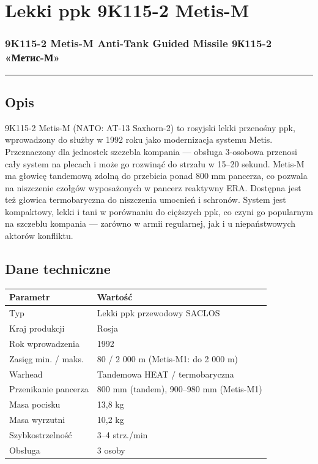 \documentclass[12pt,openany,oneside]{book}
\begin{document}
\chapter{Lekki ppk 9K115-2 Metis-M}\label{lekki-ppk-9k115-2-metis-m}

\subsection{9K115-2 Metis-M Anti-Tank Guided Missile \textbar{} 9К115-2
«Метис-М»}\label{k115-2-metis-m-anti-tank-guided-missile-9ux43a115-2-ux43cux435ux442ux438ux441-ux43c}

\begin{center}\rule{0.5\linewidth}{0.5pt}\end{center}

\section{Opis}\label{opis-37}

9K115-2 Metis-M (NATO: AT-13 Saxhorn-2) to rosyjski lekki przenośny ppk,
wprowadzony do służby w 1992 roku jako modernizacja systemu Metis.
Przeznaczony dla jednostek szczebla kompania --- obsługa 3-osobowa
przenosi cały system na plecach i może go rozwinąć do strzału w 15--20
sekund. Metis-M ma głowicę tandemową zdolną do przebicia ponad 800 mm
pancerza, co pozwala na niszczenie czołgów wyposażonych w pancerz
reaktywny ERA. Dostępna jest też głowica termobaryczna do niszczenia
umocnień i schronów. System jest kompaktowy, lekki i tani w porównaniu
do cięższych ppk, co czyni go popularnym na szczeblu kompania ---
zarówno w armii regularnej, jak i u niepaństwowych aktorów konfliktu.

\section{Dane techniczne}\label{dane-techniczne-37}

\begin{longtable}[]{@{}ll@{}}
\toprule\noalign{}
Parametr & Wartość \\
\midrule\noalign{}
\endhead
\bottomrule\noalign{}
\endlastfoot
Typ & Lekki ppk przewodowy SACLOS \\
Kraj produkcji & Rosja \\
Rok wprowadzenia & 1992 \\
Zasięg min. / maks. & 80 / 2 000 m (Metis-M1: do 2 000 m) \\
Warhead & Tandemowa HEAT / termobaryczna \\
Przenikanie pancerza & 800 mm (tandem), 900--980 mm (Metis-M1) \\
Masa pocisku & 13,8 kg \\
Masa wyrzutni & 10,2 kg \\
Szybkostrzelność & 3--4 strz./min \\
Obsługa & 3 osoby \\
\end{longtable}
\end{document}
